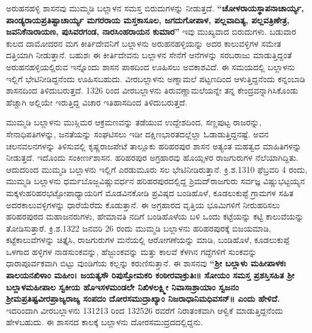 ಅರುಹನಹಳ್ಳಿ ಶಾಸನವು ಮುಮ್ಮಡಿ ಬಲ್ಲಾಳನ ಸಮಸ್ತ ಬಿರುದುಗಳನ್ನು ನೀಡುತ್ತದೆ. \textbf{“ಚೋಳರಾಯಸ್ಥಾಪನಾಚಾರ್ಯ್ಯ, ಪಾಂಡ್ಯರಾಯಪ್ರತಿಷ್ಟಾಚಾರ್ಯ್ಯ ಮಗರರಾಯ ಮಸ್ತಕಾಸೂಲ, ಜಗದುಗೋಪಾಳ, ಪಲ್ಲವಾದಿತ್ಯ, ಪಲ್ಲವತ್ರಿಣೇತ್ರ,\general{\break } ಜವನಿಕೆನಾರಾಯಣ, ಪುಸಿವರಗಂಡ, ನಾರಸಿಂಹರಾಯನ ಕುಮಾರ”} ಇವು ಮುಖ್ಯವಾದ ಬಿರುದುಗಳು. ಬಡುವಾರ ಕುಲದ ದಾಮೋದರನ ಮಗ ಕೀರ್ತಿದೇವನಿಗೆ ಬಲ್ಲಾಳನು ಅರುಹನಹಳ್ಳಿಯನ್ನು ಅದರ ಕಾಲುವಳ್ಳಿಗಳ ಸಮೇತ ದತ್ತಿಯಾಗಿ ನೀಡುತ್ತಾನೆ. ಬಹುಶಃ ಈ ಕೀರ್ತಿದೇವನು ಬಲ್ಲಾಳನ ಸೇನೆಗೆ ಆನೆಗಳನ್ನು ಸರಬರಾಜು ಮಾಡುತ್ತಿದ್ದಂತೆ ಅರುಹನಹಳ್ಳಿಯಲ್ಲಿರುವ ಇನ್ನೊಂದು ಶಾಸನ ಪಾಠದಿಂದ ಊಹಿಸಲು ಅವಕಾಶವಿದೆ. ಈ ಸಮಯದಲ್ಲಿ ಬಲ್ಲಾಳನು ಇಲ್ಲಿಗೆ ಭೇಟಿನೀಡಿದ್ದನೆಂದು ಊಹಿಸಬಹುದು. ವೀರಬಲ್ಲಾಳನು ಅಣ್ನಾಮಲೆ ಪಟ್ಟಣದಿಂದ ಆಳುತ್ತಿದ್ದನೆಂದು ಕನ್ನಂಬಾಡಿ ಶಾಸನದಿಂದ ತಿಳಿದುಬರುತ್ತದೆ. 1326 ರಿಂದ ವೀರಬಲ್ಲಾಳನು ತಿರುವಣ್ಣಾಮಲೆಯನ್ನೇ ತನ್ನ ಕೇಂದ್ರವನ್ನಾಗಿಸಿಕೊಂಡು ಹೆಚ್ಚಾಗಿ ಅಲ್ಲಿಯೇ ಇರುತ್ತಿದ್ದ ವಿಚಾರ ಇತಿಹಾಸದಿಂದ ತಿಳಿದುಬರುತ್ತದೆ. 

ಮುಮ್ಮಡಿ ಬಲ್ಲಾಳನು ಮುಸ್ಲಿಮರ ಆಕ್ರಮಣವನ್ನು ತಡೆಯುವ ಉದ್ದೇಶದಿಂದ, ಸಣ್ಣಪುಟ್ಟ ರಾಜರನ್ನು, ಸೇನಾಧಿಪತಿಗಳನ್ನು, ಜನತೆಯನ್ನು ಸಂಘಟಿಸಲು ಇಡೀ ದಕ್ಷಿಣಭಾರತದಲ್ಲೆಲ್ಲಾ ಓಡಾಡುತ್ತಿದ್ದನಷ್ಟೆ. ಅವನ ಚಲನವಲನಗಳನ್ನು ತಿಳಿಸುವಲ್ಲಿ ಕೃಷ್ಣರಾಜಪೇಟೆ ತಾಲ್ಲೂಕು ಹರಿಹರಪುರ ಶಾಸನ ಅತ್ಯಂತ ಮಹತ್ವದ ಮಾಹಿತಿಗಳನ್ನು ನೀಡುತ್ತದೆ. ಇದೊಂದು ಸಂಕೀರ್ಣ\-ಶಾಸನ. ಹರಿಹರಪುರ ಅಗ್ರಹಾರವು ಹೊಯ್ಸಳರ ರಾಜಗುರುಗಳ ನೆಲೆಯಾಗಿದ್ದಿತು. ಆದುದರಿಂದ ಮುಮ್ಮಡಿ ಬಲ್ಲಾಳನು ಇಲ್ಲಿಗೆ ಎರಡುಮೂರು ಸಲ ಭೇಟಿನೀಡಿರುತ್ತಾನೆ. ಕ್ರಿ.ಶ.1310 ಫೆಬ್ರವರಿ 4 ರಂದು, ಮುಮ್ಮಡಿ ಬಲ್ಲಾಳನು ಧರ್ಮಬೊಜ್ಜವಿಷ್ಣುವರ್ಧನ ಹರಿಹರಪುರದಲ್ಲಿದ್ದ ಶ್ರಿಮದ್​ರಾಜಗುರು ಸರ್ವಜ್ಞ ವಿಷ್ಣುಭಟ್ಟಯ್ಯನ ಮಕ್ಕಳು\break ಹರಿಹರಭಟ್ಟೋಪಾಧ್ಯಾಯರಿಗೆ ಮೊಡವಿನಕೋಡಿ ಪ್ರವಿಷ್ಠದ ಬಂಡಿಹೊಳೆ, ಕೂಡಲುಕುಪ್ಟೆ ಗ್ರಾಮಗಳ ಸಹಿತ ಅದರ\break ಕಾಲುವಳ್ಳಿಗಳನ್ನು ಧಾರೆಯೆರೆದು ಕೊಡುತ್ತಾನೆ. ಈ ಅಗ್ರಹಾರದ ವೃತ್ತಿಯ ಭೂಮಿಗಳಿಗೆ ನೀರುಹರಿಸಲು ಹರಿಹರಪುರದ ಮಹಾಜನರುಗಳು, ಹೇಮಾವತಿ ನದಿಗೆ ಬಂಡಿಹೊಳೆಯ ಬಳಿ ಒಂದು ಕಟ್ಟೆಯನ್ನು ಕಟ್ಟಿ ಕಾಲುವೆಯನ್ನು ತೋಡಿಸುತ್ತಾರೆ. ಕ್ರಿ.ಶ.1322 ಜನವರಿ 26 ರಂದು ಮುಮ್ಮಡಿ ಬಲ್ಲಾಳನು ಹರಿಹರಪುರಕ್ಕೆ ಬಿಜಯಮಾಡಿ, ಕಟ್ಟೆಕಾಲುವೆಗಳನ್ನು ಚಿತ್ತೈಸಿ, ರಾಜಗುರುಗಳ ಮನೆಯಲ್ಲಿ ಆರೋಗಣೆಯನ್ನು ಮಾಡಿ, ಬಂಡಿಹೊಳೆ, ಕೂಡಲುಕುಪ್ಪೆ ಒಳಗಾದ ಹಳ್ಳಿಗಳ ನಾಡಸುಂಕವನ್ನು, ಹೆಜ್ಜುಂಕವನ್ನು ಮತ್ತು ಕಾಲವೆ ಕೆಳಗಿನ ಗದ್ದೆಗಳಿಗೆ ಸುಂಕವನ್ನು ಧಾರಾಪೂರ್ವಕವಾಗಿ ಬಿಟ್ಟು ವುಂಡಿಗೆಯ ಕಲ್ಲನ್ನು ಕರುಣಿಸು\-ತ್ತಾನೆ. ಈ ಶಾಸನವು \textbf{“ಶ‍್ರೀ ಬಲ್ಲಾಳು ಮಹೀಪಾಳಕಃ ಪಾಲಯನಖಿಳಾಂ ಮಹೀಂ। ಜಯತ್ಯಸೌ ರಿಪುಸ್ತೋಮಕರಿ ಕಂಠೀರವಾಕ್ರುತಿಃ॥ ಸೋಯಂ ಸಮಸ್ತ ಪ್ರಶಸ್ತಿಸಹಿತ ಶ‍್ರೀ ಬಲ್ಲಾಳಮಹೀಪಾಲ ಸ್ವಕೀಯ ಹೊಇಸಳಮಂಡಲೇ ನಿಖಿಳಲಕ್ಷ್ಮೀ ನಿವಾಸಾಶ್ರಾಯಾಂ ಸ್ವಜನಂ ಶ‍್ರೀಮಪ್ರತಿಷ್ಟವೀರಪ್ರಾಜ್ಯರಾಜ್ಯ ಸಂಪದಂ ದೋರಸಮುದ್ರಾಖ್ಯಾಂ ನಿಜರಾಧಾನಿಮಧಿವಸನ್​॥ ಎಂದು ಹೇಳಿದೆ. } ಇದರಿಂದಾಗಿ ವೀರಬಲ್ಲಾಳನು 131213 ರಿಂದ 132526 ರವರೆಗೆ ನಿರಾತಂಕವಾಗಿ ಆಳ್ವಿಕೆ ಮಾಡುತ್ತಿದ್ದನೆಂದು ಹೇಳಬಹುದು. ಈ ಶಾಸನದ ಕಾಲಕ್ಕೆ ಬಲ್ಲಾಳನು ದೋರಸಮುದ್ರದದಲ್ಲಿದ್ದನು. 

